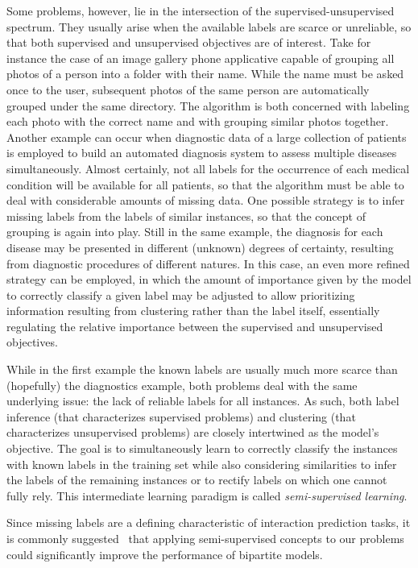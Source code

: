 Some problems, however, lie in the intersection of the supervised-unsupervised spectrum. They usually arise when the available labels are scarce or unreliable, so that both supervised and unsupervised objectives are of interest. Take for instance the case of an image gallery phone applicative capable of grouping all photos of a person into a folder with their name. While the name must be asked once to the user, subsequent photos of the same person are automatically grouped under the same directory. The algorithm is both concerned with labeling each photo with the correct name and with grouping similar photos together. Another example can occur when diagnostic data of a large collection of patients is employed to build an automated diagnosis system to assess multiple diseases simultaneously. Almost certainly, not all labels for the occurrence of each medical condition will be available for all patients, so that the algorithm must be able to deal with considerable amounts of missing data. One possible strategy is to infer missing labels from the labels of similar instances, so that the concept of grouping is again into play. Still in the same example, the diagnosis for each disease may be presented in different (unknown) degrees of certainty, resulting from diagnostic procedures of different natures. In this case, an even more refined strategy can be employed, in which the amount of importance given by the model to correctly classify a given label may be adjusted to allow prioritizing information resulting from clustering rather than the label itself, essentially regulating the relative importance between the supervised and unsupervised objectives.

While in the first example the known labels are usually much more scarce than (hopefully) the diagnostics example, both problems deal with the same underlying issue: the lack of reliable labels for all instances. As such, both label inference (that characterizes supervised problems) and clustering (that characterizes unsupervised problems) are closely intertwined as the model's objective. The goal is to simultaneously learn to correctly classify the instances with known labels in the training set while also considering similarities to infer the labels of the remaining instances or to rectify labels on which one cannot fully rely. This intermediate learning paradigm is called \emph{semi-supervised learning}.

Since missing labels are a defining characteristic of interaction prediction tasks, it is commonly suggested~\cite{he2017simboost,liu2016neighborhood}%
that applying semi-supervised concepts to our problems could significantly improve the performance of bipartite models.

